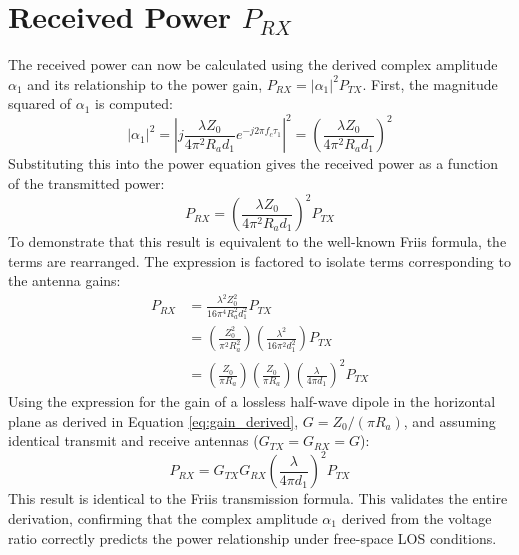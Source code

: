 \section{Received Power $P_{RX}$}
The received power can now be calculated using the derived complex amplitude $\alpha_1$ and its relationship to the power gain, $P_{RX} = |\alpha_1|^2 P_{TX}$. First, the magnitude squared of $\alpha_1$ is computed:
\begin{equation}
	|\alpha_1|^2 = \left| j \frac{\lambda Z_0}{4\pi^2 R_a d_1} e^{-j2\pi f_c \tau_1} \right|^2 = \left( \frac{\lambda Z_0}{4\pi^2 R_a d_1} \right)^2
\end{equation}
Substituting this into the power equation gives the received power as a function of the transmitted power:
\begin{equation}
	\boxed{P_{RX} = \left( \frac{\lambda Z_0}{4\pi^2 R_a d_1} \right)^2 P_{TX}}
\end{equation}
To demonstrate that this result is equivalent to the well-known Friis formula, the terms are rearranged. The expression is factored to isolate terms corresponding to the antenna gains:
\begin{align}
	P_{RX} &= \frac{\lambda^2 Z_0^2}{16\pi^4 R_a^2 d_1^2} P_{TX} \\
	&= \left( \frac{Z_0^2}{\pi^2 R_a^2} \right) \left( \frac{\lambda^2}{16\pi^2 d_1^2} \right) P_{TX} \\
	&= \left( \frac{Z_0}{\pi R_a} \right) \left( \frac{Z_0}{\pi R_a} \right) \left( \frac{\lambda}{4\pi d_1} \right)^2 P_{TX}
\end{align}
Using the expression for the gain of a lossless half-wave dipole in the horizontal plane as derived in Equation \ref{eq:gain_derived}, $G = Z_0/(\pi R_a)$, and assuming identical transmit and receive antennas ($G_{TX} = G_{RX} = G$):
\begin{equation}
	P_{RX} = G_{TX} G_{RX} \left( \frac{\lambda}{4\pi d_1} \right)^2 P_{TX} \label{eq:los_power_final_detailed}
\end{equation}
This result is identical to the Friis transmission formula. This validates the entire derivation, confirming that the complex amplitude $\alpha_1$ derived from the voltage ratio correctly predicts the power relationship under free-space LOS conditions.

